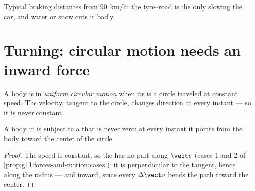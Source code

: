 \begin{omfigure}

{\small Typical braking distances from \qty{90}{km/h}: the tyre--road
 is the only  slowing the car, and water or snow cuts it badly.}
\end{omfigure}

\section{Turning: circular motion needs an inward force}

\begin{definition}\label{def:g11:forces-and-motion:ucm}
A body is in \emph{uniform circular motion} when its  is a circle traveled at constant speed. The
velocity, tangent to the circle, changes direction at every instant ---
so it is never constant.
\end{definition}

\begin{proposition}\label{prop:g11:forces-and-motion:inward}
A body in  is subject to a  that is
never zero: at every instant it points from the body toward the center
of the circle.
\end{proposition}

\begin{proof}
The speed is constant, so the  has no part along $\vect v$
(cases 1 and 2 of \cref{prop:g11:forces-and-motion:cases}): it is
perpendicular to the tangent, hence along the radius --- and inward,
since every $\Delta \vect v$ bends the path toward the center.
\end{proof}

